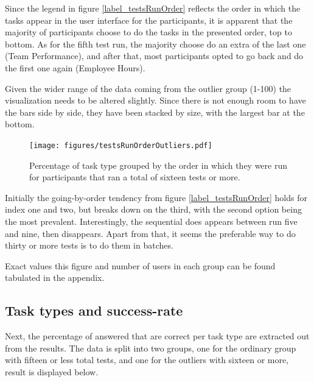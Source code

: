 \documentclass[nofilelist,dvipsnames]{cslthse-msc}
\begin{document}
        Since the legend in figure \ref{label_testsRunOrder} reflects the order
        in which the tasks appear in the user interface for the participants,
        it is apparent that the majority of participants choose to do the tasks
        in the presented order, top to bottom. As for the fifth test run, the
        majority choose do an extra of the last one (Team Performance), and
        after that, most participants opted to go back and do the first one
        again (Employee Hours).

        \newpage
        Given the wider range of the data coming from the outlier group (1-100)
        the visualization needs to be altered slightly. Since there is not
        enough room to have the bars side by side, they have been stacked by
        size, with the largest bar at the bottom.
				\begin{figure}[ht!]
					\centering
					\texttt{[image: figures/testsRunOrderOutliers.pdf]}
          \caption{
            Percentage of task type grouped by the order in which they were
            run for participants that ran a total of sixteen tests or more.
          }
				\end{figure}

        Initially the going-by-order tendency from figure
        \ref{label_testsRunOrder} holds for index one and two, but breaks down
        on the third, with the second option being the most prevalent.
        Interestingly, the sequential does appears between run five and nine,
        then disappears. Apart from that, it seems the preferable way to do
        thirty or more tests is to do them in batches.

        Exact values this figure and number of users in each group can be found
        tabulated in the appendix. 

%
      \newpage
      \subsection{Task types and success-rate}

        Next, the percentage of answered that are correct per task type are
        extracted out from the results. The data is split into two groups, one
        for the ordinary group with fifteen or less total tests, and one for
        the outliers with sixteen or more, result is displayed below.
\end{document}
